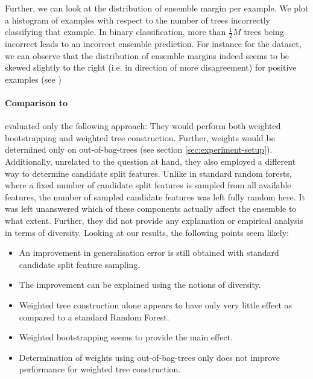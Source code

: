 \documentclass[../main.tex]{subfiles}
\begin{document}
Further, we can look at the distribution of ensemble margin per example. We plot a histogram of examples with respect to the number of trees incorrectly classifying that example. In binary classification, more than $\frac{1}{2}M$ trees being incorrect leads to an incorrect ensemble prediction. %
For instance for the \cover dataset, we can observe that the distribution of ensemble margins indeed seems to be skewed slightly to the right (i.e. in direction of more disagreement) for positive examples (see )




\paragraph{Comparison to \cite{bernard_DynamicRandomForests_2012}} 
\citeauthor{bernard-drf} evaluated only the following approach: They would perform both weighted bootstrapping and weighted tree construction. Further, weights would be determined only on out-of-bag-trees (see section \ref{sec:experiment-setup}). Additionally, unrelated to the question at hand, they also employed a different way to determine candidate split features. Unlike in standard random forests, where a fixed number of candidate split features is sampled from all available features, the number of sampled candidate features was left fully random here. It was left unanswered which of these components actually affect the ensemble to what extent. Further, they did not provide any explanation or empirical analysis in terms of diversity.
Looking at our results, the following points seem likely:
\begin{itemize}
    \item An improvement in generalisation error is still obtained with standard candidate split feature sampling.
    \item The improvement can be explained using the notions of diversity.
    \item Weighted tree construction alone appears to have only very little effect as compared to a standard Random Forest.
    \item Weighted bootstrapping seems to provide the main effect.
    \item Determination of weights using out-of-bag-trees only does not improve performance for weighted tree construction. 
\end{itemize}
\end{document}

